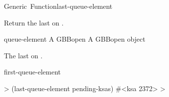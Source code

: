 \documentclass[10pt,twoside,english,pdftex]{article}
\begin{document}
\begin{functiondoc}{Generic~Function}{last-queue-element}{
    \returns{} }
%

\fnsyntax

\fnpurpose Return the last  on .

\fnmethods
{}

\fnpackage {}

\fnmodule {}

\fnargs
\begin{args}{queue-element}
\arg[queue] A GBBopen 
 A GBBopen  object
\end{args}

\fnreturns The last  on .
  
\begin{alsos}{first-queue-element}
\end{alsos}

\fnexample
%
\W\supp
\begin{example}
  > (last-queue-element pending-ksas)
  #<ksa 2372>
  >
\end{example}

\end{functiondoc}

\end{document}
